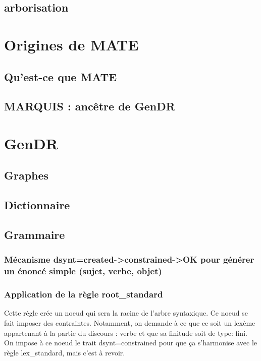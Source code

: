 \subsection{arborisation}

\section{Origines de MATE}

\subsection{Qu'est-ce que MATE}

\subsection{MARQUIS : ancêtre de GenDR}

\section{GenDR}

\subsection{Graphes}

\subsection{Dictionnaire}

\subsection{Grammaire}

\subsubsection{Mécanisme dsynt=created->constrained->OK pour générer un énoncé simple (sujet, verbe, objet)}

\subsubsection{Application de la règle root{\_}standard}
Cette règle crée un noeud qui sera la racine de l'arbre syntaxique. Ce noeud se fait imposer des contraintes. Notamment, on demande à ce que ce soit un lexème appartenant à la partie du discours : verbe et que sa finitude soit de type: fini. On impose à ce noeud le trait dsynt=constrained pour que ça s'harmonise avec le règle lex{\_}standard, mais c'est à revoir.

